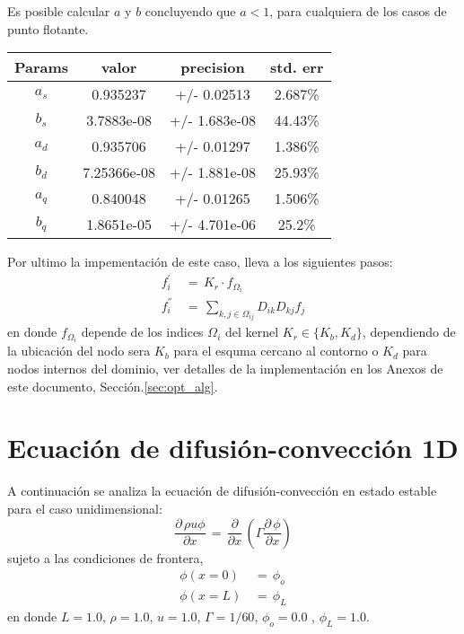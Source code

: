\documentclass[9pt,technote,twoside,letterpaper,onecolumn]{IEEEtran}
\begin{document}
\begin{multicols}{2}
Es posible calcular $a$ y $b$ concluyendo que $a<1$, para cualquiera de los casos de punto flotante.
\begin{center}\scriptsize
\begin{tabular}{ |c|c|c|c| } 
  \hline
  Params & valor & precision & std. err \\
  \hline 
  $a_s$& 0.935237&+/- 0.02513&2.687\%\\
  $b_s$& 3.7883e-08&+/- 1.683e-08&44.43\%\\  \hline
  $a_d$& 0.935706&+/- 0.01297&1.386\%\\
  $b_d$& 7.25366e-08&+/- 1.881e-08&25.93\%\\  \hline
  $a_q$& 0.840048&+/- 0.01265&1.506\%\\
  $b_q$&1.8651e-05&+/- 4.701e-06&25.2\%\\
  \hline
\end{tabular}
\end{center}

Por ultimo la impementación de este caso, lleva a los siguientes pasos:
\begin{align}
  f^{'}_i\,&=\,K_r\cdot f_{\Omega_i}\label{eq:buffdiff}\\
  f^{''}_i\,&=\,\sum_{k,j\in\Omega_{ij}}D_{ik}D_{kj} f_j\label{eq:optimDiff}
\end{align}
en donde $f_{\Omega_i}$ depende de los indices $\Omega_i$ del kernel $K_r\in\{K_b, K_d\}$, dependiendo de la ubicación del nodo sera $K_b$ para el esquma cercano al contorno o $K_d$ para nodos internos del dominio, ver detalles de la implementación en los Anexos de este documento, Sección.\ref{sec:opt_alg}.

\section{Ecuación de difusión-convección 1D}
\label{sec:dif-conv}
A continuación se analiza la ecuación de difusión-convección en estado estable para el caso unidimensional:
\begin{equation}
  \frac{\partial\,\rho u \phi}{\partial x}\,=\,\frac{\partial}{\partial x}\,\left(\Gamma\frac{\partial\,\phi}{\partial x}\right)
  \label{eq:dif-conv}
\end{equation}
sujeto a las condiciones de frontera,
\begin{align}
  \phi(x=0)\,&=\,\phi_o\\
  \phi(x=L)\,&=\,\phi_L
\end{align}
en donde $L=1.0$, $\rho=1.0$, $u=1.0$, $\Gamma=1/60$, $\phi_o=0.0$ , $\phi_L=1.0$. 


\end{multicols}
\end{document}
